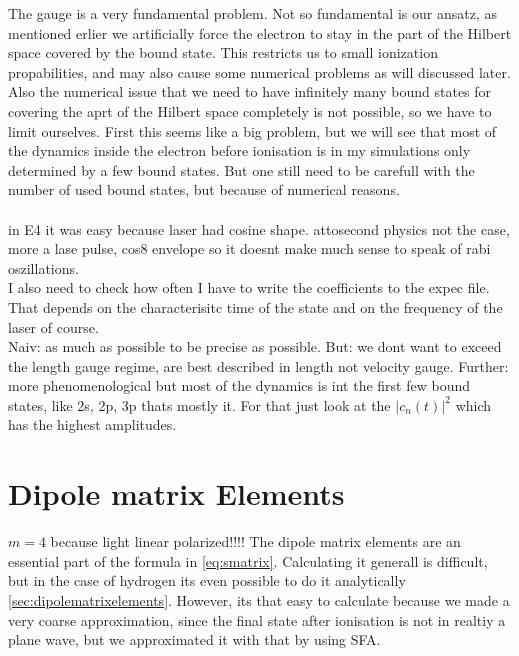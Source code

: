 The gauge is a very fundamental problem. Not so fundamental is our ansatz, as mentioned erlier we artificially force the electron to stay in the part of the Hilbert space covered by the bound state.
This restricts us to small ionization propabilities, and may also cause some numerical problems as will discussed later.\\ %
Also the numerical issue that we need to have infinitely many bound states for covering the aprt of the Hilbert space completely is not possible, so we have to limit ourselves.
First this seems like a big problem, but we will see that most of the dynamics inside the electron before ionisation is in my simulations only determined by a few bound states.
But one still need to be carefull with the number of used bound states, but because of numerical reasons.\\\\


in E4 it was easy because laser had cosine shape. attosecond physics not the case, more a lase pulse, cos8 envelope so it doesnt make much sense to speak of rabi oszillations.\\
I also need to check how often I have to write the coefficients to the expec file. That depends on the characterisitc time of the state and on the frequency of the laser of course.\\
Naiv: as much as possible to be precise as possible. 
But: we dont want to exceed the length gauge regime, are best described in length not velocity gauge.
Further: more phenomenological but most of the dynamics is int the first few bound states, like 2s, 2p, 3p thats mostly it. 
For that just look at the $|c_n(t)|^2$ which has the highest amplitudes. %





\section{Dipole matrix Elements}
$m=4$ because light linear polarized!!!!
The dipole matrix elements are an essential part of the formula in \eqref{eq:smatrix}. 
Calculating it generall is difficult, but in the case of hydrogen its even possible to do it analytically \ref{sec:dipolematrixelements}.
However, its that easy to calculate because we made a very coarse approximation, since the final state after ionisation is not in realtiy a plane wave, but we approximated it with that by using SFA.

